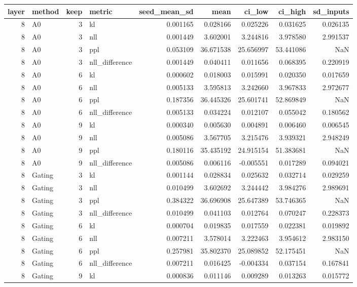 \begin{tabular}{rlrlrrrrr}
\toprule
layer & method & keep & metric & seed_mean_sd & mean & ci_low & ci_high & sd_inputs \\
\midrule
8 & A0 & 3 & kl & 0.001165 & 0.028166 & 0.025226 & 0.031625 & 0.026135 \\
8 & A0 & 3 & nll & 0.001449 & 3.602001 & 3.244816 & 3.978580 & 2.991537 \\
8 & A0 & 3 & ppl & 0.053109 & 36.671538 & 25.656997 & 53.441086 & NaN \\
8 & A0 & 3 & nll_difference & 0.001449 & 0.040411 & 0.011656 & 0.068395 & 0.220919 \\
8 & A0 & 6 & kl & 0.000602 & 0.018003 & 0.015991 & 0.020350 & 0.017659 \\
8 & A0 & 6 & nll & 0.005133 & 3.595813 & 3.242660 & 3.967833 & 2.972677 \\
8 & A0 & 6 & ppl & 0.187356 & 36.445326 & 25.601741 & 52.869849 & NaN \\
8 & A0 & 6 & nll_difference & 0.005133 & 0.034224 & 0.012107 & 0.055042 & 0.180562 \\
8 & A0 & 9 & kl & 0.000340 & 0.005630 & 0.004891 & 0.006460 & 0.006545 \\
8 & A0 & 9 & nll & 0.005086 & 3.567705 & 3.215476 & 3.939321 & 2.948249 \\
8 & A0 & 9 & ppl & 0.180116 & 35.435192 & 24.915154 & 51.383681 & NaN \\
8 & A0 & 9 & nll_difference & 0.005086 & 0.006116 & -0.005551 & 0.017289 & 0.094021 \\
8 & Gating & 3 & kl & 0.001144 & 0.028834 & 0.025632 & 0.032714 & 0.029259 \\
8 & Gating & 3 & nll & 0.010499 & 3.602692 & 3.244442 & 3.984276 & 2.989691 \\
8 & Gating & 3 & ppl & 0.384322 & 36.696908 & 25.647389 & 53.746365 & NaN \\
8 & Gating & 3 & nll_difference & 0.010499 & 0.041103 & 0.012764 & 0.070247 & 0.228373 \\
8 & Gating & 6 & kl & 0.000704 & 0.019835 & 0.017559 & 0.022381 & 0.019892 \\
8 & Gating & 6 & nll & 0.007211 & 3.578014 & 3.222463 & 3.954612 & 2.983150 \\
8 & Gating & 6 & ppl & 0.257981 & 35.802370 & 25.089852 & 52.175451 & NaN \\
8 & Gating & 6 & nll_difference & 0.007211 & 0.016425 & -0.004334 & 0.037154 & 0.167841 \\
8 & Gating & 9 & kl & 0.000836 & 0.011146 & 0.009289 & 0.013263 & 0.015772 \\

\end{tabular}
